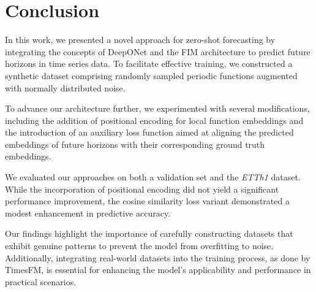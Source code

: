 \documentclass{article}
\theoremstyle{plain}
\theoremstyle{definition}
\theoremstyle{remark}
\begin{document}
\section{Conclusion}
In this work, we presented a novel approach for zero-shot forecasting by integrating the concepts of DeepONet and the FIM architecture to predict future horizons in time series data. To facilitate effective training, we constructed a synthetic dataset comprising randomly sampled periodic functions augmented with normally distributed noise.

To advance our architecture further, we experimented with several modifications, including the addition of positional encoding for local function embeddings and the introduction of an auxiliary loss function aimed at aligning the predicted embeddings of future horizons with their corresponding ground truth embeddings. 

We evaluated our approaches on both a validation set and the \emph{ETTh1} dataset. While the incorporation of positional encoding did not yield a significant performance improvement, the cosine similarity loss variant demonstrated a modest enhancement in predictive accuracy.

Our findings highlight the importance of carefully constructing datasets that exhibit genuine patterns to prevent the model from overfitting to noise. Additionally, integrating real-world datasets into the training process, as done by TimesFM, is essential for enhancing the model's applicability and performance in practical scenarios. 










\newpage
\appendix
\onecolumn
\end{document}
